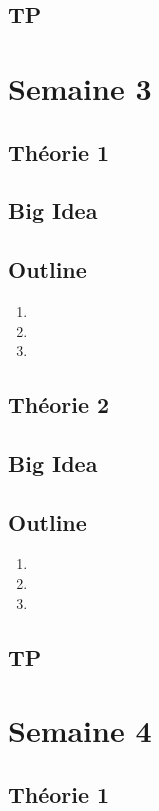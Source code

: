 \documentclass{article}
\begin{document}
\subsection{TP}

\pagebreak
\section{Semaine 3}
\subsection{Théorie 1}
\subsection*{Big Idea}
\subsection*{Outline}
\begin{enumerate}
    \item
    \item
    \item
\end{enumerate}
\subsection{Théorie 2}
\subsection*{Big Idea}
\subsection*{Outline}
\begin{enumerate}
    \item
    \item
    \item
\end{enumerate}
\subsection{TP}

\pagebreak
\section{Semaine 4}
\subsection{Théorie 1}
\end{document}
